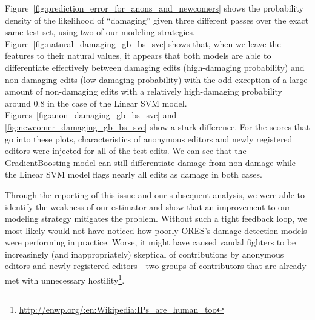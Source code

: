 Figure~\ref{fig:prediction_error_for_anons_and_newcomers} shows the probability density of the likelihood of ``damaging'' given three different passes over the exact same test set, using two of our modeling strategies.  Figure~\ref{fig:natural_damaging_gb_bs_svc} shows that, when we leave the features to their natural values, it appears that both models are able to differentiate effectively between damaging edits (high-damaging probability) and non-damaging edits (low-damaging probability) with the odd exception of a large amount of non-damaging edits with a relatively high-damaging probability around 0.8 in the case of the Linear SVM model.  Figures~\ref{fig:anon_damaging_gb_bs_svc} and \ref{fig:newcomer_damaging_gb_bs_svc} show a stark difference.  For the scores that go into these plots, characteristics of anonymous editors and newly registered editors were injected for all of the test edits.  We can see that the GradientBoosting model can still differentiate damage from non-damage while the Linear SVM model flags nearly all edits as damage in both cases.

Through the reporting of this issue and our subsequent analysis, we were able to identify the weakness of our estimator and show that an improvement to our modeling strategy mitigates the problem.  Without such a tight feedback loop, we most likely would not have noticed how poorly ORES's damage detection models were performing in practice.  Worse, it might have caused vandal fighters to be increasingly (and inappropriately) skeptical of contributions by anonymous editors and newly registered editors---two groups of contributors that are already met with unnecessary hostility\footnote{\url{http://enwp.org/:en:Wikipedia:IPs_are_human_too}}\cite{halfaker2013rise}.
